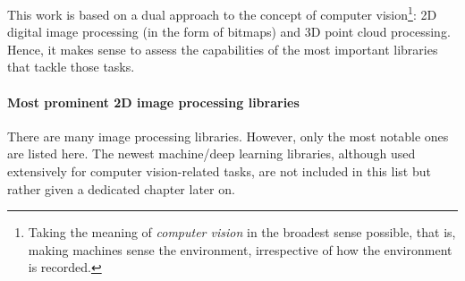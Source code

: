 \documentclass[../main.tex]{subfiles}
\begin{document}
This work is based on a dual approach to the concept of computer vision\footnote{Taking the meaning of \emph{computer vision} in the broadest sense possible, that is, making machines sense the environment, irrespective of how the environment is recorded.}: 2D digital image processing (in the form of bitmaps) and 3D point cloud processing. Hence, it makes sense to assess the capabilities of the most important libraries that tackle those tasks.

\paragraph{Most prominent 2D image processing libraries} 
There are many image processing libraries. However, only the most notable ones are listed here. The newest machine/deep learning libraries, although used extensively for computer vision-related tasks, are not included in this list but rather given a dedicated chapter later on.
\end{document}
